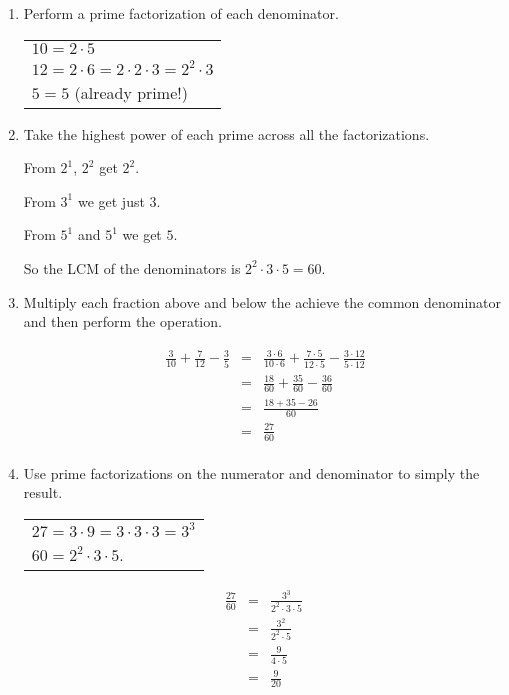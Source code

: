 \documentclass[letterpaper,12pt,fleqn]{article}
\begin{document}
\begin{enumerate}
\item Perform a prime factorization of each denominator.

\begin{tabular}{l}
$10=2\cdot5$ \\
$12=2\cdot6=2\cdot2\cdot3=2^2\cdot3$ \\
$5=5$ (already prime!) \\
\end{tabular}

\item Take the highest power of each prime across all the factorizations.

From $2^1$, $2^2$ get $2^2$.

From $3^1$ we get just $3$.

From $5^1$ and $5^1$ we get $5$.

So the LCM of the denominators is $2^2\cdot3\cdot5=60$.

\item Multiply each fraction above and below the achieve the common
denominator and then perform the operation.

\begin{eqnarray*}\
\frac{3}{10}+\frac{7}{12}-\frac{3}{5} &=&
    \frac{3\cdot6}{10\cdot6}+\frac{7\cdot5}{12\cdot5}-
    \frac{3\cdot12}{5\cdot12} \\
&=& \frac{18}{60}+\frac{35}{60}-\frac{36}{60} \\
&=& \frac{18+35-26}{60} \\
&=& \frac{27}{60} \\
\end{eqnarray*}

\item Use prime factorizations on the numerator and denominator to simply the
result.

\begin{tabular}{l}
$27=3\cdot9=3\cdot3\cdot3=3^3$ \\
$60=2^2\cdot3\cdot5$.
\end{tabular}

\begin{eqnarray*}
\frac{27}{60} &=& \frac{3^3}{2^2\cdot3\cdot5} \\
              &=& \frac{3^2}{2^2\cdot5} \\
              &=& \frac{9}{4\cdot5} \\
              &=& \frac{9}{20} \\
\end{eqnarray*}
\end{enumerate}
\end{document}
